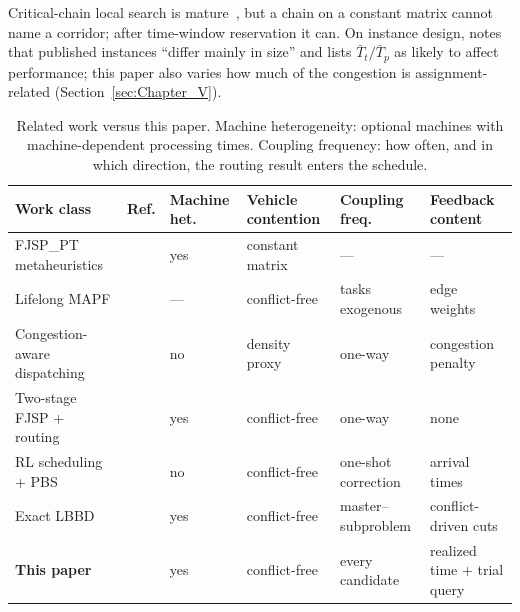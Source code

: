 Critical-chain local search is mature~\cite{otala2021graph,tamssaouet2023neighborhood,qin2026knowledge}, but a chain on a constant matrix cannot name a corridor; after time-window reservation it can.
On instance design, \cite{xin2025review} notes that published instances ``differ mainly in size'' and lists $\bar{T}_t/\bar{T}_p$ as likely to affect performance; this paper also varies how much of the congestion is assignment-related (Section~\ref{sec:Chapter_V}).

\begin{table}[t]
  \caption{Related work versus this paper.
Machine heterogeneity: optional machines with machine-dependent processing times.
Coupling frequency: how often, and in which direction, the routing result enters the schedule.}
\label{tab:related}
\footnotesize
\begin{tabular}{@{}lclll l@{}}
\toprule
Work class & Ref. & Machine het. & Vehicle contention & Coupling freq. & Feedback content \\
\midrule
FJSP\_PT metaheuristics & \cite{meng2025cp,qin2026knowledge,fu2025integrated}
  & yes & constant matrix & --- & --- \\
Lifelong MAPF & \cite{gao2023mapf,zhang2024guidance}
  & --- & conflict-free & tasks exogenous & edge weights \\
Congestion-aware dispatching & \cite{kim2026congestion}
  & no & density proxy & one-way & congestion penalty \\
Two-stage FJSP + routing & \cite{sun2023integrated}
  & yes & conflict-free & one-way & none \\
RL scheduling + PBS & \cite{li2026framework}
  & no & conflict-free & one-shot correction & arrival times \\
Exact LBBD & \cite{vanos2026exact}
  & yes & conflict-free & master--subproblem & conflict-driven cuts \\
\textbf{This paper} &
  & yes & conflict-free & every candidate & realized time + trial query \\
\bottomrule
\end{tabular}
\end{table}


